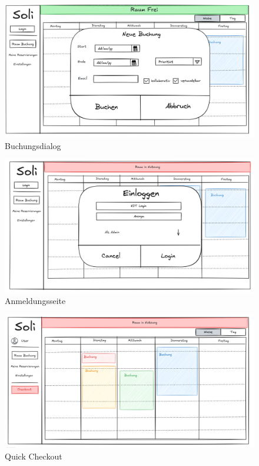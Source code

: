 \begin{figure}[ht]
    \centering
    \includegraphics[scale=0.15]{figures/ui/buchungsdialog.png}
    \caption{Buchungsdialog}
    \label{fig:buchung}
\end{figure}

\begin{figure}[ht]
    \centering
    \includegraphics[scale=0.15]{figures/ui/anmeldungsseite.png}
    \caption{Anmeldungsseite}
    \label{fig:login}
\end{figure}

\begin{figure}[ht]
    \centering
    \includegraphics[scale=0.15]{figures/ui/checkout.png}
    \caption{Quick Checkout}
    \label{fig:checkout}
\end{figure}
\clearpage
